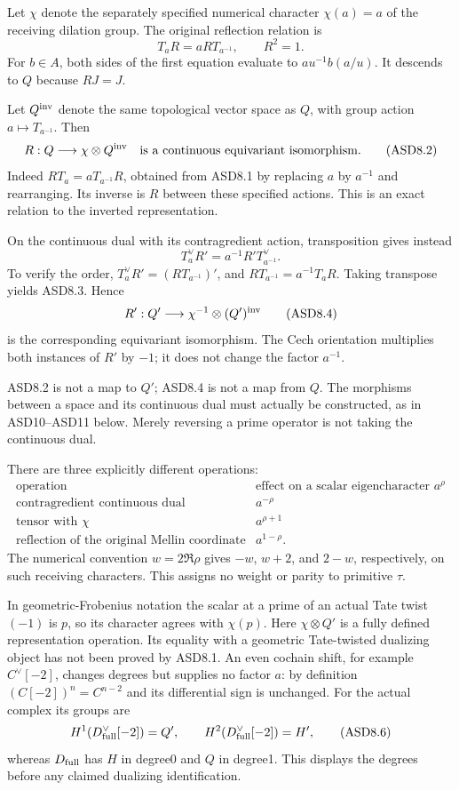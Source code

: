 Let \(\chi\) denote the separately specified numerical character
\(\chi(a)=a\) of the receiving dilation group. The original reflection
relation is \[
 T_aR=aRT_{a^{-1}},\qquad R^2=1.
 \tag{ASD8.1}
\] For \(b\in A\), both sides of the first equation evaluate to
\(a u^{-1}b(a/u)\). It descends to \(Q\) because \(RJ=J\).

Let \(Q^{\rm inv}\) denote the same topological vector space as \(Q\),
with group action \(a\mapsto T_{a^{-1}}\). Then \[
 R:Q\longrightarrow\chi\otimes Q^{\rm inv}
 \quad\text{is a continuous equivariant isomorphism}.
 \tag{ASD8.2}
\] Indeed \(RT_a=aT_{a^{-1}}R\), obtained from ASD8.1 by replacing \(a\)
by \(a^{-1}\) and rearranging. Its inverse is \(R\) between these
specified actions. This is an exact relation to the inverted
representation.

On the continuous dual with its contragredient action, transposition
gives instead \[
 T_a^\vee R'=a^{-1}R'T_{a^{-1}}^\vee.
 \tag{ASD8.3}
\] To verify the order, \(T_a^\vee R'=(RT_{a^{-1}})'\), and
\(RT_{a^{-1}}=a^{-1}T_aR\). Taking transpose yields ASD8.3. Hence \[
 R':Q'\longrightarrow\chi^{-1}\otimes(Q')^{\rm inv}
 \tag{ASD8.4}
\] is the corresponding equivariant isomorphism. The Cech orientation
multiplies both instances of \(R'\) by \(-1\); it does not change the
factor \(a^{-1}\).

ASD8.2 is not a map to \(Q'\); ASD8.4 is not a map from \(Q\). The
morphisms between a space and its continuous dual must actually be
constructed, as in ASD10--ASD11 below. Merely reversing a prime operator
is not taking the continuous dual.

There are three explicitly different operations: \[
 \begin{array}{c|c}
 \text{operation}&\text{effect on a scalar eigencharacter }a^\rho\\
 \hline
 \text{contragredient continuous dual}&a^{-\rho}\\
 \text{tensor with }\chi&a^{\rho+1}\\
 \text{reflection of the original Mellin coordinate}&a^{1-\rho}.
 \end{array}
 \tag{ASD8.5}
\] The numerical convention \(w=2\Re\rho\) gives \(-w\), \(w+2\), and
\(2-w\), respectively, on such receiving characters. This assigns no
weight or parity to primitive \(\tau\).

In geometric-Frobenius notation the scalar at a prime of an actual Tate
twist \((-1)\) is \(p\), so its character agrees with \(\chi(p)\). Here
\(\chi\otimes Q'\) is a fully defined representation operation. Its
equality with a geometric Tate-twisted dualizing object has not been
proved by ASD8.1. An even cochain shift, for example \(C^\vee[-2]\),
changes degrees but supplies no factor \(a\): by definition
\((C[-2])^n=C^{n-2}\) and its differential sign is unchanged. For the
actual complex its groups are \[
 H^1(D_{\rm full}^\vee[-2])=Q',\qquad
 H^2(D_{\rm full}^\vee[-2])=H',
 \tag{ASD8.6}
\] whereas \(D_{\rm full}\) has \(H\) in degree0 and \(Q\) in degree1.
This displays the degrees before any claimed dualizing identification.

